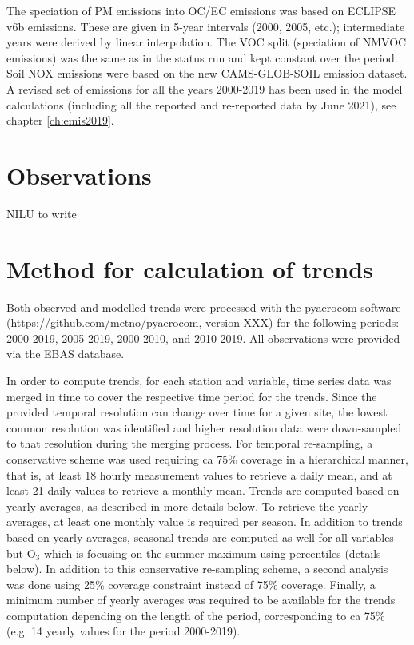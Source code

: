 The speciation of PM emissions into OC/EC emissions was based on ECLIPSE v6b emissions. These are given in 5-year intervals (2000, 2005, etc.); intermediate years were derived by linear interpolation. The VOC split (speciation of NMVOC emissions) was the same as in the status run and kept constant over the period.
Soil NOX emissions were based on the new CAMS-GLOB-SOIL emission dataset.
A revised set of emissions for all the years 2000-2019 has been used in the model calculations (including all the reported and re-reported data by June 2021), see chapter \ref{ch:emis2019}.

\section{\label{OBSTrends}{Observations}} NILU to write

\section{\label{Method}{Method for calculation of trends}}
Both observed and modelled trends were processed with the pyaerocom software (\url{https://github.com/metno/pyaerocom}, version XXX) for the following periods: 2000-2019, 2005-2019, 2000-2010, and 2010-2019. All observations were provided via the EBAS database. 

In order to compute trends, for each station and variable, time series data was merged in time to cover the respective time period for the trends.
Since the provided temporal resolution can change over time for a given site, the lowest common resolution was identified and higher resolution data were down-sampled to that resolution during the merging process. For temporal re-sampling, a conservative scheme was used requiring ca 75\% coverage in a hierarchical manner, that is, at least 18 hourly measurement values to retrieve a daily mean, and at least 21 daily values to retrieve a monthly mean. Trends are computed based on yearly averages, as described in more details below. To retrieve the yearly averages, at least one monthly value is required per season. In addition to trends based on yearly averages, seasonal trends are computed as well for all variables but O$_{3}$ which is focusing on the summer maximum using percentiles (details below). In addition to this conservative re-sampling scheme, a second analysis was done using 25\% coverage constraint instead of 75\% coverage. Finally, a minimum number of yearly averages was required to be available for the trends computation depending on the length of the period, corresponding to ca 75\% (e.g. 14 yearly values for the period 2000-2019).


